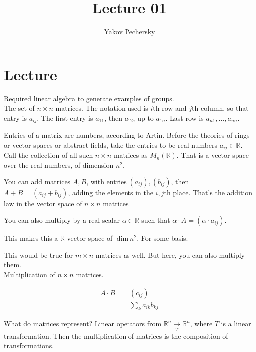 \documentclass[12pt]{article}
\newcommand{\RR}{\mathbb{R}}
\theoremstyle{definition}
\begin{document}
\author{Yakov Pechersky}

\title{Lecture 01}

\maketitle
\section{Lecture}
Required linear algebra to generate examples of groups.
\\

The set of \( n \times n \) matrices.
The notation used is \(i\)th row and \(j\)th column, so that
entry is \(a_{ij}\). The first entry is \(a_{11}\), then \(a_{12}\),
up to \(a_{1n}\). Last row is \(a_{n1}, \ldots, a_{nn}\).

Entries of a matrix are numbers, according to Artin. Before the theories of
rings or vector spaces or abstract fields, take the entries to be real numbers
\( a_{ij} \in \RR \). Call the collection of all such \( n \times n \) matrices
as \( M_n(\RR)\). That is a vector space over the real numbers, of dimension \(n^2\).

You can add matrices \(A, B\), with entries \((a_{ij}), (b_{ij})\), then
\(A + B = (a_{ij} + b_{ij})\), adding the elements in the \(i,j\)th place.
That's the addition law in the vector space of \(n \times n\) matrices.

You can also multiply by a real scalar \(\alpha\in\RR \) such that
\(\alpha\cdot A =(\alpha\cdot a_{ij})\).

This makes this a \( \RR \) vector space of \( \dim n^2 \). For some basis.

This would be true for \(m \times n\) matrices as well. But here, you can also
multiply them.
\\

Multiplication of \(n \times n\) matrices.

\begin{equation}
\begin{split}
 A \cdot B & = (c_{ij}) \\
 & = \sum_k a_{ik}b_{kj}
\end{split}
\end{equation}

What do matrices represent? Linear operators from
\(\RR^n \xrightarrow[T]{} \RR^n\),
where \(T\) is a linear transformation.
Then the multiplication of matrices is
the composition of transformations.
\end{document}
